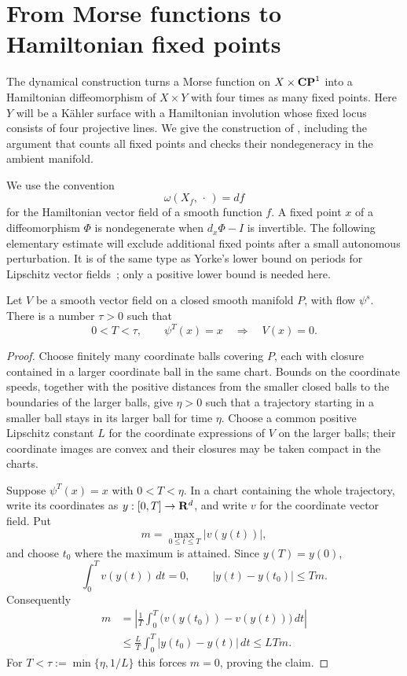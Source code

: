 \section{From Morse functions to Hamiltonian fixed points}
\label{dyn:section}
\label{sec:dynamics}

The dynamical construction turns a Morse function on
$X\times\mathbf{CP}^1$ into a Hamiltonian diffeomorphism of $X\times Y$ with
four times as many fixed points.  Here $Y$ will be a K\"ahler surface
with a Hamiltonian involution whose fixed locus consists of four
projective lines.  We give the construction of
\cite[Section~4]{OpenAICompanion}, including the argument that counts
all fixed points and checks their nondegeneracy in the ambient manifold.

We use the convention
\[
  \omega(X_f,\,\cdot\,)=df
\]
for the Hamiltonian vector field of a smooth function $f$.  A fixed
point $x$ of a diffeomorphism $\Phi$ is nondegenerate when
$d_x\Phi-I$ is invertible.  The following elementary estimate will
exclude additional fixed points after a small autonomous perturbation.
It is of the same type as Yorke's lower bound on periods for Lipschitz
vector fields~\cite{Yorke1969}; only a positive lower bound is needed here.

\begin{lemma}
\label{dyn:short-period}
Let $V$ be a smooth vector field on a closed smooth manifold $P$, with
flow $\psi^s$.  There is a number $\tau>0$ such that
\[
  0<T<\tau,\qquad \psi^T(x)=x
  \quad\Longrightarrow\quad V(x)=0.
\]
\end{lemma}

\begin{proof}
Choose finitely many coordinate balls covering $P$, each with closure
contained in a larger coordinate ball in the same chart.  Bounds on
the coordinate speeds, together with the positive distances from
the smaller closed balls to the boundaries of the larger balls, give
$\eta>0$ such that a trajectory starting in a smaller ball stays in
its larger ball for time $\eta$.  Choose a common positive Lipschitz
constant $L$ for the coordinate expressions of $V$ on the larger
balls; their coordinate images are convex and their closures may be
taken compact in the charts.

Suppose $\psi^T(x)=x$ with $0<T<\eta$.  In a chart containing the whole
trajectory, write its coordinates as $y:[0,T]\to\mathbf R^d$, and write $v$
for the coordinate vector field.  Put
\[
  m=\max_{0\leq t\leq T}|v(y(t))|,
\]
and choose $t_0$ where the maximum is attained.  Since $y(T)=y(0)$,
\[
  \int_0^T v(y(t))\,dt=0,
  \qquad |y(t)-y(t_0)|\leq Tm.
\]
Consequently
\[
\begin{split}
  m
  &=\left|\frac1T\int_0^T
       \bigl(v(y(t_0))-v(y(t))\bigr)\,dt\right|\\
  &\leq\frac{L}{T}\int_0^T |y(t_0)-y(t)|\,dt
   \leq LTm.
\end{split}
\]
For $T<\tau:=\min\{\eta,1/L\}$ this forces $m=0$, proving the claim.
\end{proof}

